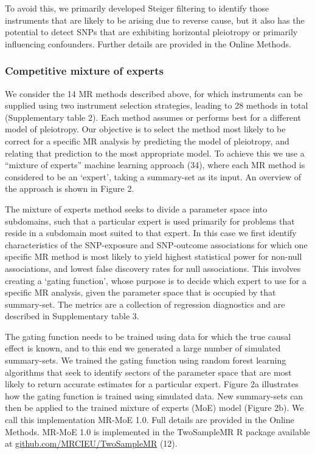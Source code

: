 \documentclass[]{article}
\begin{document}
To avoid this, we primarily developed Steiger filtering to identify
those instruments that are likely to be arising due to reverse cause,
but it also has the potential to detect SNPs that are exhibiting
horizontal pleiotropy or primarily influencing confounders. Further
details are provided in the Online Methods.

\subsubsection{Competitive mixture of
experts}\label{competitive-mixture-of-experts}

We consider the 14 MR methods described above, for which instruments can
be supplied using two instrument selection strategies, leading to 28
methods in total (Supplementary table 2). Each method assumes or
performs best for a different model of pleiotropy. Our objective is to
select the method most likely to be correct for a specific MR analysis
by predicting the model of pleiotropy, and relating that prediction to
the most appropriate model. To achieve this we use a ``mixture of
experts'' machine learning approach (34), where each MR method is
considered to be an `expert', taking a summary-set as its input. An
overview of the approach is shown in Figure 2.

The mixture of experts method seeks to divide a parameter space into
subdomains, such that a particular expert is used primarily for problems
that reside in a subdomain most suited to that expert. In this case we
first identify characteristics of the SNP-exposure and SNP-outcome
associations for which one specific MR method is most likely to yield
highest statistical power for non-null associations, and lowest false
discovery rates for null associations. This involves creating a `gating
function', whose purpose is to decide which expert to use for a specific
MR analysis, given the parameter space that is occupied by that
summary-set. The metrics are a collection of regression diagnostics and
are described in Supplementary table 3.

The gating function needs to be trained using data for which the true
causal effect is known, and to this end we generated a large number of
simulated summary-sets. We trained the gating function using random
forest learning algorithms that seek to identify sectors of the
parameter space that are most likely to return accurate estimates for a
particular expert. Figure 2a illustrates how the gating function is
trained using simulated data. New summary-sets can then be applied to
the trained mixture of experts (MoE) model (Figure 2b). We call this
implementation MR-MoE 1.0. Full details are provided in the Online
Methods. MR-MoE 1.0 is implemented in the TwoSampleMR R package
available at
\href{https://github.com/MRCIEU/TwoSampleMR}{github.com/MRCIEU/TwoSampleMR}
(12).
\end{document}
